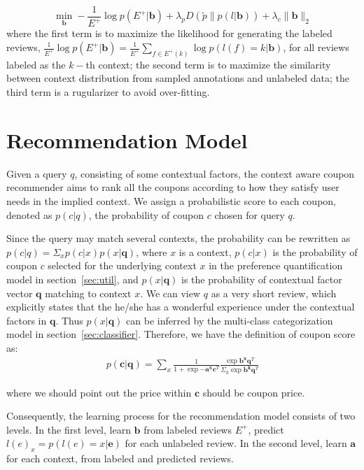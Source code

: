 \documentclass[preprint,12pt]{elsarticle}
\begin{document}
\begin{equation}\label{equ:cat}
  \min_{\mathbf{b}}\!-\frac{1}{E^+}\!\log\!p(E^+|\mathbf{b})\!+\!\lambda_pD(\tilde{p}\|p(l|\mathbf{b}))\!+\!\lambda_c\|\mathbf{b}\!\|_2
\end{equation}
where the first term is to maximize the likelihood for generating the labeled reviews, $\frac{1}{E^+}\log p(E^+|\mathbf{b})=\frac{1}{E^+}\sum_{f\in E^+(k)}\log p(l(f)=k|\mathbf{b})$, for all reviews labeled as the $k-$th context; the second term is to maximize the similarity between context distribution from sampled annotations and unlabeled data; the third term is a rugularizer to avoid over-fitting.

\section{Recommendation Model}\label{sec:rec}
Given a query $q$, consisting of some contextual factors, the context aware coupon recommender aims to rank all the coupons according to how they satisfy user needs in the implied context. We assign a probabilistic score to each coupon, denoted as $p(c|q)$, the probability of coupon $c$ chosen for query $q$.

Since the query may match several contexts, the probability can be rewritten as  $p(c|q)=\Sigma_x p(c|x)p(x|\mathbf{q})$, where $x$ is a context, $p(c|x)$ is the probability of coupon $c$ selected for the underlying context $x$ in the preference quantification model in section~\ref{sec:util}, and $p(x|\mathbf{q})$ is the probability of contextual factor vector $\mathbf{q}$ matching to context $x$. We can view $q$ as a very short review, which explicitly states that the he/she has a wonderful experience under the contextual factors in $\mathbf{q}$. Thus $p(x|\mathbf{q})$ can be inferred by the multi-class categorization model in section~\ref{sec:classifier}. Therefore, we have the definition of coupon score as:
\begin{align}\label{equ:score}
  p(\mathbf{c}|\mathbf{q})\!=\!\sum_x\frac{1}{1\!+\exp{-\mathbf{a^x}\mathbf{c}^T}}
  \frac{\exp{\mathbf{b^x}\mathbf{q}^T}}{\Sigma_{k}\exp{\mathbf{b^k}\mathbf{q}^T}}
\end{align}

where we should point out the price within $\mathbf{c}$ should be coupon price.

Consequently, the learning process for the recommendation model consists of two levels. In the first level, learn $\mathbf{b}$ from labeled reviews $E^+$, predict $l(e)_x=p(l(e)=x|\mathbf{e})$ for each unlabeled review. In the second level, learn $\mathbf{a}$ for each context, from labeled and predicted reviews. %
\end{document}
